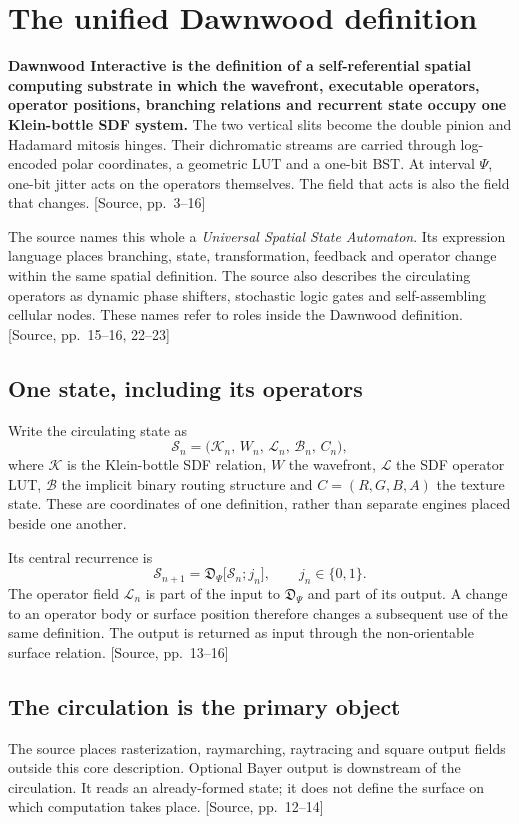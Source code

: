 \documentclass[11pt,a4paper]{article}
\newcommand{\src}[1]{{\sffamily\footnotesize\color{DWGray}[Source, pp.~#1]}}
\newcommand{\Klein}{\mathcal{K}}
\newcommand{\LUT}{\mathcal{L}}
\newcommand{\State}{\mathcal{S}}
\begin{document}
\section{The unified Dawnwood definition}
\textbf{Dawnwood Interactive is the definition of a self-referential spatial computing substrate in which the wavefront, executable operators, operator positions, branching relations and recurrent state occupy one Klein-bottle SDF system.} The two vertical slits become the double pinion and Hadamard mitosis hinges. Their dichromatic streams are carried through log-encoded polar coordinates, a geometric LUT and a one-bit BST. At interval $\Psi$, one-bit jitter acts on the operators themselves. The field that acts is also the field that changes. \src{3--16}

The source names this whole a \emph{Universal Spatial State Automaton}. Its expression language places branching, state, transformation, feedback and operator change within the same spatial definition. The source also describes the circulating operators as dynamic phase shifters, stochastic logic gates and self-assembling cellular nodes. These names refer to roles inside the Dawnwood definition. \src{15--16, 22--23}

\subsection{One state, including its operators}
Write the circulating state as
\begin{equation}
\State_n = \bigl(\Klein_n,\, W_n,\,\LUT_n,\,\mathcal{B}_n,\,C_n\bigr),
\end{equation}
where $\Klein$ is the Klein-bottle SDF relation, $W$ the wavefront, $\LUT$ the SDF operator LUT, $\mathcal{B}$ the implicit binary routing structure and $C=(R,G,B,A)$ the texture state. These are coordinates of one definition, rather than separate engines placed beside one another.

Its central recurrence is
\begin{equation}
\boxed{\State_{n+1}=\mathfrak{D}_{\Psi}\bigl[\State_n;j_n\bigr],
\qquad j_n\in\{0,1\}.}
\end{equation}
The operator field $\LUT_n$ is part of the input to $\mathfrak{D}_{\Psi}$ and part of its output. A change to an operator body or surface position therefore changes a subsequent use of the same definition. The output is returned as input through the non-orientable surface relation. \src{13--16}

\subsection{The circulation is the primary object}
The source places rasterization, raymarching, raytracing and square output fields outside this core description. Optional Bayer output is downstream of the circulation. It reads an already-formed state; it does not define the surface on which computation takes place. \src{12--14}
\end{document}
